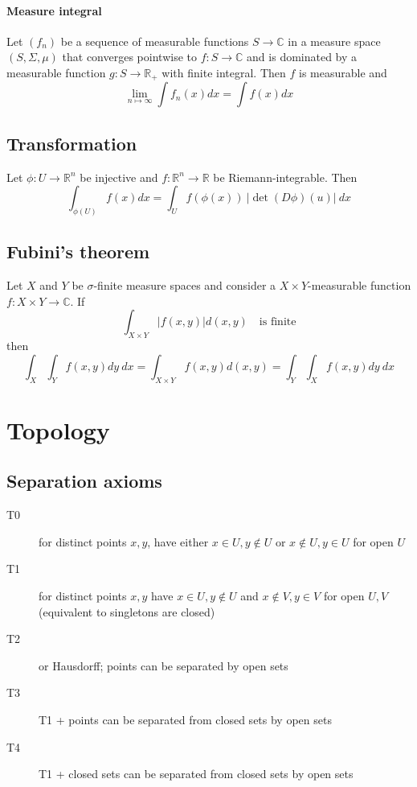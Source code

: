 \documentclass{scrartcl}
\newcommand{\R}{\mathbb{R}}
\newcommand{\C}{\mathbb{C}}
\begin{document}
\paragraph{Measure integral}
Let $(f_n)$ be a sequence of measurable functions $S \to \C$ in a measure space $(S, \Sigma, \mu)$ that converges pointwise to $f: S \to \C$ and is dominated by a measurable function $g: S \to \R_+$ with finite integral.
Then $f$ is measurable and
\begin{equation*}
    \lim_{n \mapsto \infty} \int f_n(x) dx = \int f(x) dx
\end{equation*}

\subsection{Transformation}
Let $\phi: U \to \mathbb{R}^n$ be injective and $f: \R^n \to \R$ be Riemann-integrable. Then
\begin{equation}
    \int_{\phi(U)} f(x) dx = \int_U f(\phi(x)) \ |\det(D\phi)(u)| \ dx \nonumber
\end{equation}

\subsection{Fubini's theorem}
Let $X$ and $Y$ be $\sigma$-finite measure spaces and consider a $X \times Y$-measurable function $f: X \times Y \to \C$. If
\begin{equation*}
    \int_{X \times Y} |f(x, y)| d(x, y) \quad \text{is finite}
\end{equation*}
then
\begin{equation*}
    \int_X \int_Y f(x, y) dy \ dx = \int_{X \times Y} f(x, y) d(x, y) = \int_Y \int_X f(x, y) dy \ dx
\end{equation*}

\section{Topology}

\subsection{Separation axioms}
\begin{description}
    \item[T0] for distinct points $x, y$, have either $x \in U, y \notin U$ or $x \notin U, y \in U$ for open $U$
    \item[T1] for distinct points $x, y$ have $x \in U, y \notin U$ and $x \notin V, y \in V$ for open $U, V$ (equivalent to singletons are closed)
    \item[T2] or Hausdorff; points can be separated by open sets
    \item[T3] T1 + points can be separated from closed sets by open sets
    \item[T4] T1 + closed sets can be separated from closed sets by open sets
\end{description}
\end{document}

